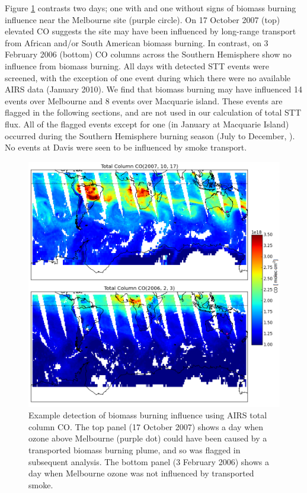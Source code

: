     Figure \ref{fig:excludedeg} contrasts two days; one with and one without signs of biomass burning influence near the Melbourne site (purple circle).
    On 17 October 2007 (top) elevated CO suggests the site may have been influenced by long-range transport from African and/or South American biomass burning.
    In contrast, on 3 February 2006 (bottom) CO columns across the Southern Hemisphere show no influence from biomass burning.
    All days with detected STT events were screened, with the exception of one event during which there were no available AIRS data (January 2010).
    We find that biomass burning may have influenced 14 events over Melbourne and 8 events over Macquarie island.
    These events are flagged in the following sections, and are not used in our calculation of total STT flux.
    All of the flagged events except for one (in January at Macquarie Island) occurred during the Southern Hemisphere burning season (July to December, \citet{Edwards2006}). %
    No events at Davis were seen to be influenced by smoke transport.
    
    \begin{figure}[t]
      \includegraphics[width=12cm]{figures/AIRS_compare.png}
      \caption{ %
	Example detection of biomass burning influence using AIRS total column CO. 
	The top panel (17 October 2007) shows a day when ozone above Melbourne (purple dot) could have been caused by a transported biomass burning plume, and so was flagged in subsequent analysis.
	The bottom panel (3 February 2006) shows a day when Melbourne ozone was not influenced by transported smoke.
	}
      \label{fig:excludedeg}
    \end{figure}
    
